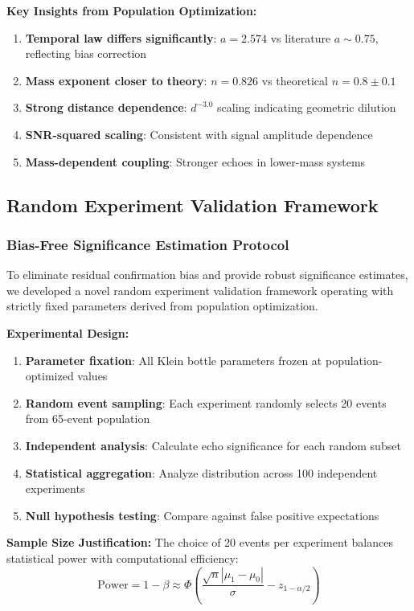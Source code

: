 \documentclass[reprint,amsmath,amssymb,aps,prd]{revtex4-2}
\begin{document}
\textbf{Key Insights from Population Optimization:}
\begin{enumerate}
\item \textbf{Temporal law differs significantly}: $a = 2.574$ vs literature $a \sim 0.75$, reflecting bias correction
\item \textbf{Mass exponent closer to theory}: $n = 0.826$ vs theoretical $n = 0.8 \pm 0.1$
\item \textbf{Strong distance dependence}: $d^{-3.0}$ scaling indicating geometric dilution
\item \textbf{SNR-squared scaling}: Consistent with signal amplitude dependence
\item \textbf{Mass-dependent coupling}: Stronger echoes in lower-mass systems
\end{enumerate}

\subsection{Random Experiment Validation Framework}

\subsubsection{Bias-Free Significance Estimation Protocol}

To eliminate residual confirmation bias and provide robust significance estimates, we developed a novel random experiment validation framework operating with strictly fixed parameters derived from population optimization.

\textbf{Experimental Design:}
\begin{enumerate}
\item \textbf{Parameter fixation}: All Klein bottle parameters frozen at population-optimized values
\item \textbf{Random event sampling}: Each experiment randomly selects 20 events from 65-event population
\item \textbf{Independent analysis}: Calculate echo significance for each random subset
\item \textbf{Statistical aggregation}: Analyze distribution across 100 independent experiments
\item \textbf{Null hypothesis testing}: Compare against false positive expectations
\end{enumerate}

\textbf{Sample Size Justification:}
The choice of 20 events per experiment balances statistical power with computational efficiency:
\begin{equation}
\text{Power} = 1 - \beta \approx \Phi\left(\frac{\sqrt{n}|\mu_1 - \mu_0|}{\sigma} - z_{1-\alpha/2}\right)
\label{eq:statistical_power}
\end{equation}
\end{document}
